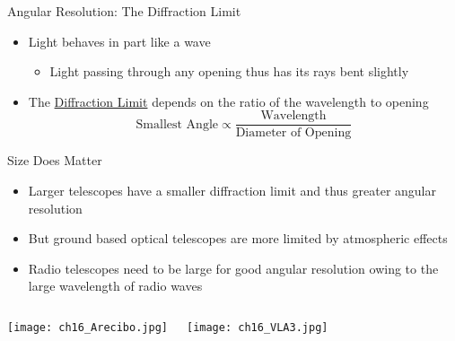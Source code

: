 \documentclass[pdf, aspectratio=169]{beamer}
\begin{document}
\begin{frame}{Angular Resolution: The Diffraction Limit}
  \begin{itemize}
	\item Light behaves in part like a wave
	  \begin{itemize}
		\item Light passing through any opening thus has its rays bent slightly
	  \end{itemize}
	  \begin{center}
	  \end{center}
	\item The \underline{Diffraction Limit} depends on the ratio of the wavelength to opening
	  \[\text{Smallest Angle} \propto \frac{\text{Wavelength}}{\text{Diameter of Opening}}\]
  \end{itemize}
\end{frame}

\begin{frame}{Size Does Matter}
  \begin{itemize}
	\item Larger telescopes have a smaller diffraction limit and thus greater angular resolution
	\item But ground based optical telescopes are more limited by atmospheric effects
	\item Radio telescopes need to be large for good angular resolution owing to the large wavelength of radio waves
  \end{itemize}
  \begin{columns}
	\begin{center}
	  \texttt{[image: ch16\_Arecibo.jpg]}
	\end{center}
	\begin{center}
	  \texttt{[image: ch16\_VLA3.jpg]}
	\end{center}
  \end{columns}
\end{frame}
\end{document}
